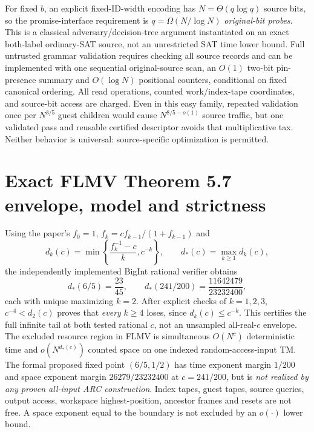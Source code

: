 \documentclass[11pt]{article}
\begin{document}
For fixed $b$, an explicit fixed-ID-width encoding has $N=\Theta(q\log q)$ source bits, so the promise-interface requirement is $q=\Omega(N/\log N)$ \emph{original-bit probes}. This is a classical adversary/decision-tree argument instantiated on an exact both-label ordinary-SAT source, not an unrestricted SAT time lower bound. Full untrusted grammar validation requires checking all source records and can be implemented with one sequential original-source scan, an $O(1)$ two-bit pin-presence summary and $O(\log N)$ positional counters, conditional on fixed canonical ordering. All read operations, counted work/index-tape coordinates, and source-bit access are charged. Even in this easy family, repeated validation once per $N^{3/5}$ guest children would cause $N^{8/5-o(1)}$ source traffic, but one validated pass and reusable certified descriptor avoids that multiplicative tax. Neither behavior is universal: source-specific optimization is permitted.

\section{Exact FLMV Theorem 5.7 envelope, model and strictness}
Using the paper's $f_0=1$, $f_k=cf_{k-1}/(1+f_{k-1})$ and
\[
d_k(c)=\min\left\{\frac{f_k^{-1}-c}{k},c^{-k}\right\},\qquad d_*(c)=\max_{k\ge1}d_k(c),
\]
the independently implemented BigInt rational verifier obtains
\[
d_*(6/5)=\frac{23}{45},\qquad
d_*(241/200)=\frac{11642479}{23232400},
\]
each with unique maximizing $k=2$. After explicit checks of $k=1,2,3$, $c^{-4}<d_2(c)$ proves that \emph{every} $k\ge4$ loses, since $d_k(c)\le c^{-k}$. This certifies the full infinite tail at both tested rational $c$, not an unsampled all-real-$c$ envelope. The excluded resource region in FLMV is simultaneous $O(N^c)$ deterministic time and $o(N^{d_*(c)})$ counted space on one indexed random-access-input TM. The formal proposed fixed point $(6/5,1/2)$ has time exponent margin $1/200$ and space exponent margin $26279/23232400$ at $c=241/200$, but is \emph{not realized by any proven all-input ARC construction}. Index tapes, guest tapes, source queries, output access, workspace highest-position, ancestor frames and resets are not free. A space exponent equal to the boundary is not excluded by an $o(\cdot)$ lower bound.
\end{document}
